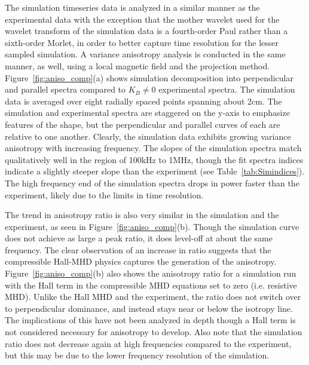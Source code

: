 \documentclass[aip,prl,amsmath,amssymb,reprint,superscriptaddress]{revtex4-1} %
\begin{document}
The simulation timeseries data is analyzed in a similar manner as the experimental data with the exception that the mother wavelet used for the wavelet transform of the simulation data is a fourth-order Paul rather than a sixth-order Morlet, in order to better capture time resolution for the lesser sampled simulation. A variance anisotropy analysis is conducted in the same manner, as well, using a local magnetic field and the projection method. Figure~\ref{fig:aniso_comp}(a) shows simulation decomposition into perpendicular and parallel spectra compared to $K_{B}\neq 0$ experimental spectra. The simulation data is averaged over eight radially spaced points spanning about 2cm. The simulation and experimental spectra are staggered on the y-axis to emphasize features of the shape, but the perpendicular and parallel curves of each are relative to one another. Clearly, the simulation data exhibits growing variance anisotropy with increasing frequency. The slopes of the simulation spectra match qualitatively well in the region of 100kHz to 1MHz, though the fit spectra indices indicate a slightly steeper slope than the experiment (see Table~\ref{tab:Simindices}). The high frequency end of the simulation spectra drops in power faster than the experiment, likely due to the limits in time resolution.

The trend in anisotropy ratio is also very similar in the simulation and the experiment, as seen in Figure~\ref{fig:aniso_comp}(b). Though the simulation curve does not achieve as large a peak ratio, it does level-off at about the same frequency. The clear observation of an increase in ratio suggests that the compressible Hall-MHD physics captures the generation of the anisotropy. Figure~\ref{fig:aniso_comp}(b) also shows the anisotropy ratio for a simulation run with the Hall term in the compressible MHD equations set to zero (i.e. resistive MHD). Unlike the Hall MHD and the experiment, the ratio does not switch over to perpendicular dominance, and instead stays near or below the isotropy line. The implications of this have not been analyzed in depth though a Hall term is not considered necessary for anisotropy to develop. Also note that the simulation ratio does not decrease again at high frequencies compared to the experiment, but this may be due to the lower frequency resolution of the simulation.
\end{document}
